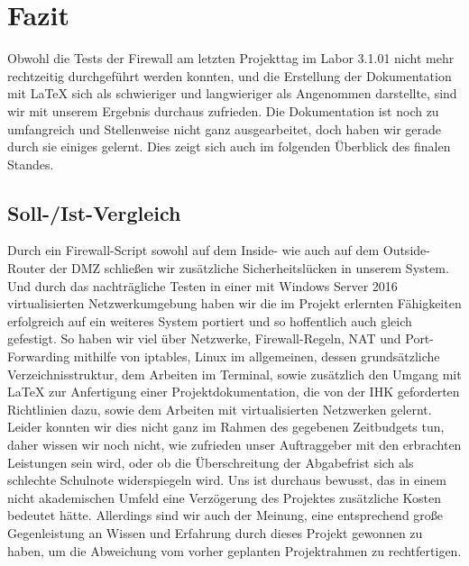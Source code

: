 \section{Fazit} 
\label{sec:Fazit}
Obwohl die Tests der Firewall am letzten Projekttag im Labor 3.1.01 nicht mehr rechtzeitig durchgeführt werden konnten, und die Erstellung der Dokumentation mit \LaTeX{ } sich als schwieriger und langwieriger als Angenommen darstellte, sind wir mit unserem Ergebnis durchaus zufrieden. Die Dokumentation ist noch zu umfangreich und Stellenweise nicht ganz ausgearbeitet, doch haben wir gerade durch sie einiges gelernt. Dies zeigt sich auch im folgenden Überblick des finalen Standes.

\subsection{Soll-/Ist-Vergleich}
\label{sec:SollIstVergleich}
Durch ein Firewall-Script sowohl auf dem Inside- wie auch auf dem Outside-Router der \ac{DMZ} schließen wir zusätzliche Sicherheitslücken in unserem System. Und durch das nachträgliche Testen in einer mit Windows Server 2016 virtualisierten Netzwerkumgebung haben wir die im Projekt erlernten Fähigkeiten erfolgreich auf ein weiteres System portiert und so hoffentlich auch gleich gefestigt. So haben wir viel über Netzwerke, Firewall-Regeln, \ac{NAT} und Port-Forwarding mithilfe von iptables, Linux im allgemeinen, dessen grundsätzliche Verzeichnisstruktur, dem Arbeiten im Terminal, sowie zusätzlich den Umgang mit \LaTeX{} zur Anfertigung einer Projektdokumentation, die von der \ac{IHK} geforderten Richtlinien dazu, sowie dem Arbeiten mit virtualisierten Netzwerken gelernt. Leider konnten wir dies nicht ganz im Rahmen des gegebenen Zeitbudgets tun, daher wissen wir noch nicht, wie zufrieden unser Auftraggeber mit den erbrachten Leistungen sein wird, oder ob die Überschreitung der Abgabefrist sich als schlechte Schulnote widerspiegeln wird.
Uns ist durchaus bewusst, das in einem nicht akademischen Umfeld eine Verzögerung des Projektes zusätzliche Kosten bedeutet hätte. Allerdings sind wir auch der Meinung, eine entsprechend große Gegenleistung an Wissen und Erfahrung durch dieses Projekt gewonnen zu haben, um die Abweichung vom vorher geplanten Projektrahmen zu rechtfertigen.
